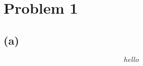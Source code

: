 \documentclass[a4paper]{article}
\begin{document}
\section*{Problem 1}
\subsection*{(a)}

\begin{equation}
hello
\end{equation}
\end{document}
